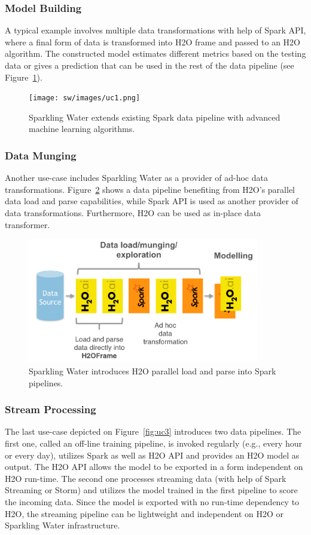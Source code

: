\documentclass{standalone}
\begin{document}
\subsubsection{Model Building}
A typical example involves multiple data transformations with help of Spark API, where a final form of data is transformed into H2O frame and passed to an H2O algorithm. The constructed model estimates different metrics based on the testing data or gives a prediction that can be used in the rest of the data pipeline (see Figure~\ref{fig:uc1}).
\begin{figure}[h!]
	\centering
	\texttt{[image: sw/images/uc1.png]}
	\caption{Sparkling Water extends existing Spark data pipeline with advanced machine learning algorithms.}
	\label{fig:uc1} 
\end{figure}

\subsubsection{Data Munging}
Another use-case includes Sparkling Water as a provider of ad-hoc data transformations. Figure~\ref{fig:uc2} shows a data pipeline benefiting from H2O's parallel data load and parse capabilities, while Spark API is used as another provider of data transformations. Furthermore, H2O can be used as in-place data transformer.

\begin{figure}[h!]
	\centering
	\includegraphics[width=0.9\textwidth]{sw/images/uc2.png}
	\caption{Sparkling Water introduces H2O parallel load and parse into Spark pipelines.}
	\label{fig:uc2} 
\end{figure}

\subsubsection{Stream Processing}
The last use-case depicted on Figure~\ref{fig:uc3} introduces two data pipelines. The first one, called an off-line training pipeline, is invoked regularly (e.g., every hour or every day), utilizes Spark as well as H2O API and provides an H2O model as output. The H2O API allows the model to be exported in a form independent on H2O run-time. The second one processes streaming data (with help of Spark Streaming or Storm) and utilizes the model trained in the first pipeline to score the incoming data. Since the model is exported with no run-time dependency to H2O, the streaming pipeline can be lightweight and independent on H2O or Sparkling Water infrastructure.
\end{document}
